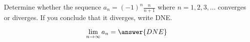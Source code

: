 \documentclass{ximera}
\author{Gregory Hartman \and Matthew Carr}
\begin{document}
\begin{exercise}




Determine whether the sequence $a_n=(-1)^n\frac{n}{n+1}$ where
$n=1,2,3,\ldots$ converges or diverges. If you conclude that it
diverges, write DNE.
\begin{prompt}
\[
\lim_{n\to\infty}a_n=\answer{DNE}
\]
\end{prompt}



\end{exercise}
\end{document}
